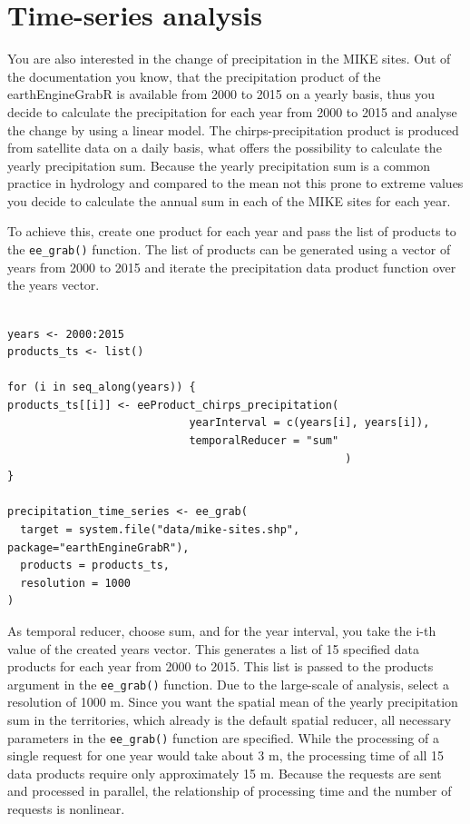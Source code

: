 \section{Time-series analysis}

You are also interested in the change of precipitation in the MIKE sites. Out of the documentation you know, that the precipitation product of the earthEngineGrabR is available from 2000 to 2015 on a yearly basis, thus you decide to calculate the precipitation for each year from 2000 to 2015 and analyse the change by using a linear model. The chirps-precipitation product is produced from satellite data on a daily basis, what offers the possibility to calculate the yearly precipitation sum. Because the yearly precipitation sum is a common practice in hydrology and compared to the mean not this prone to extreme values you decide to calculate the annual sum in each of the MIKE sites for each year. 

To achieve this, create one product for each year and pass the list of products to the \texttt{ee\_grab()} function.
The list of products can be generated using a vector of years from 2000 to 2015 and iterate the precipitation data product function over the years vector.

\newpage

\begin{lstlisting}

years <- 2000:2015
products_ts <- list()

for (i in seq_along(years)) {
products_ts[[i]] <- eeProduct_chirps_precipitation(
							yearInterval = c(years[i], years[i]), 
							temporalReducer = "sum"
													)
}

precipitation_time_series <- ee_grab(
  target = system.file("data/mike-sites.shp", package="earthEngineGrabR"),
  products = products_ts,
  resolution = 1000
)
\end{lstlisting}


As temporal reducer, choose sum, and for the year interval, you take the i-th value of the created years vector. This generates a list of 15 specified data products for each year from 2000 to 2015. This list is passed to the products argument in the \texttt{ee\_grab()} function.
Due to the large-scale of analysis, select a resolution of 1000 m. Since you want the spatial mean of the yearly precipitation sum in the territories, which already is the default spatial reducer, all necessary parameters in the \texttt{ee\_grab()} function are specified. While the processing of a single request for one year would take about 3 m, the processing time of all 15 data products require only approximately 15 m. Because the requests are sent and processed in parallel, the relationship of processing time and the number of requests is nonlinear. 

